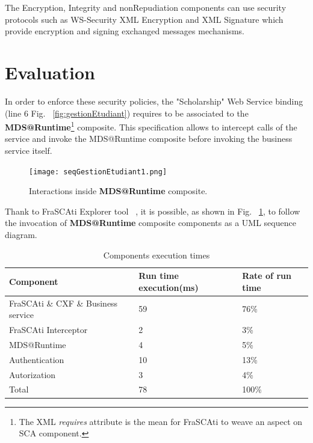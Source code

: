 \documentclass[runningheads,a4paper]{llncs}
\begin{document}
The Encryption, Integrity and nonRepudiation components can use security protocols such as WS-Security XML Encryption and XML Signature which provide encryption and signing  exchanged messages mechanisms.


\section{Evaluation}

\label{sec:exemple}


In order to enforce these security policies, the "Scholarship"  Web Service binding (line 6 Fig. ~\ref{fig:gestionEtudiant}) requires to be associated to the \textbf{MDS@Runtime}\footnote{The XML \emph{requires} attribute is the mean for FraSCAti to weave an aspect on SCA component.} composite. This specification allows to intercept calls of the service and invoke the  MDS@Runtime composite before invoking the business service itself.



\begin{figure}  
\center
\texttt{[image: seqGestionEtudiant1.png]}
\caption{Interactions inside  \textbf{MDS@Runtime} composite.}
\label{fig:sequence}
\end{figure}


Thank to FraSCAti Explorer tool ~\cite{SMF09}, it is possible, as shown in Fig. ~\ref{fig:sequence}, to follow the invocation of  \textbf{MDS@Runtime} composite components as a UML sequence diagram.


\begin{table}

\caption{Components execution times}
\begin{tabular}{@{}*{3}{|p{3.1cm}}|@{} }
\hline
Component & Run time execution(ms)   & Rate of run time \\[0.2cm]
  \hline
  FraSCAti \& CXF \& Business service & 59&  76\%\\
 FraSCAti Interceptor & 2&  3\%\\ 
 MDS@Runtime & 4&  5\%\\
 Authentication& 10& 13\%\\
 Autorization & 3& 4\%\\
 \hline
   Total & 78& 100\%\\
    \hline

\end{tabular}
\end{table}
\end{document}
